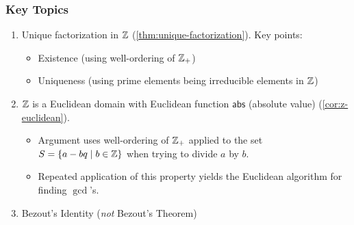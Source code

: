 \subsubsection*{Key Topics}
\begin{enumerate}[1)]
    \item
          Unique factorization in $\mathbb Z$ (\cref{thm:unique-factorization}). Key points:
          \begin{itemize}
              \item Existence (using well-ordering of $\mathbb Z_+$)
              \item Uniqueness (using prime elements being irreducible elements in $\mathbb Z$)
          \end{itemize}
    \item
          $\mathbb Z$ is a Euclidean domain with Euclidean function $\mathsf{abs}$ (absolute value) (\cref{cor:z-euclidean}).
          \begin{itemize}
              \item Argument uses well-ordering of $\mathbb Z_+$ applied to the set $S = \{a - bq\mid b\in \mathbb Z\}$ when trying to divide $a$ by $b$.
              \item Repeated application of this property yields the Euclidean algorithm for finding $\gcd$'s.
          \end{itemize}
    \item
          Bezout's Identity (\emph{not} Bezout's Theorem)


\end{enumerate}
